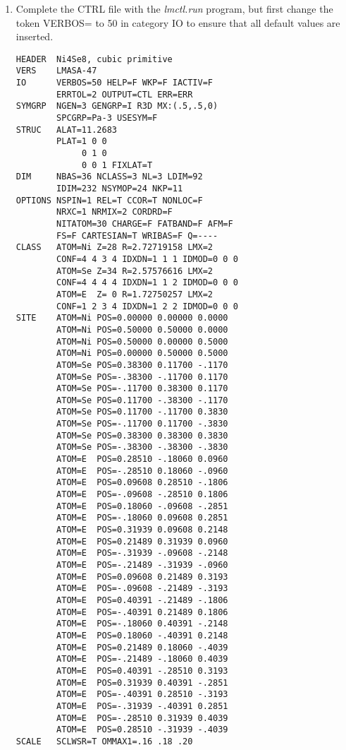 \documentclass[aps,twocolumn,a4]{revtex4}
\begin{document}
\begin{enumerate}
\item Complete the CTRL file with the {\em lmctl.run} program, but first
change the token VERBOS= to 50 in category IO to ensure that all
default values are inserted.
\begin{verbatim}
HEADER  Ni4Se8, cubic primitive
VERS    LMASA-47
IO      VERBOS=50 HELP=F WKP=F IACTIV=F
        ERRTOL=2 OUTPUT=CTL ERR=ERR
SYMGRP  NGEN=3 GENGRP=I R3D MX:(.5,.5,0)
        SPCGRP=Pa-3 USESYM=F
STRUC   ALAT=11.2683
        PLAT=1 0 0
             0 1 0
             0 0 1 FIXLAT=T
DIM     NBAS=36 NCLASS=3 NL=3 LDIM=92
        IDIM=232 NSYMOP=24 NKP=11
OPTIONS NSPIN=1 REL=T CCOR=T NONLOC=F
        NRXC=1 NRMIX=2 CORDRD=F
        NITATOM=30 CHARGE=F FATBAND=F AFM=F
        FS=F CARTESIAN=T WRIBAS=F Q=----
CLASS   ATOM=Ni Z=28 R=2.72719158 LMX=2
        CONF=4 4 3 4 IDXDN=1 1 1 IDMOD=0 0 0
        ATOM=Se Z=34 R=2.57576616 LMX=2
        CONF=4 4 4 4 IDXDN=1 1 2 IDMOD=0 0 0
        ATOM=E  Z= 0 R=1.72750257 LMX=2
        CONF=1 2 3 4 IDXDN=1 2 2 IDMOD=0 0 0
SITE    ATOM=Ni POS=0.00000 0.00000 0.0000
        ATOM=Ni POS=0.50000 0.50000 0.0000
        ATOM=Ni POS=0.50000 0.00000 0.5000
        ATOM=Ni POS=0.00000 0.50000 0.5000
        ATOM=Se POS=0.38300 0.11700 -.1170
        ATOM=Se POS=-.38300 -.11700 0.1170
        ATOM=Se POS=-.11700 0.38300 0.1170
        ATOM=Se POS=0.11700 -.38300 -.1170
        ATOM=Se POS=0.11700 -.11700 0.3830
        ATOM=Se POS=-.11700 0.11700 -.3830
        ATOM=Se POS=0.38300 0.38300 0.3830
        ATOM=Se POS=-.38300 -.38300 -.3830
        ATOM=E  POS=0.28510 -.18060 0.0960
        ATOM=E  POS=-.28510 0.18060 -.0960
        ATOM=E  POS=0.09608 0.28510 -.1806
        ATOM=E  POS=-.09608 -.28510 0.1806
        ATOM=E  POS=0.18060 -.09608 -.2851
        ATOM=E  POS=-.18060 0.09608 0.2851
        ATOM=E  POS=0.31939 0.09608 0.2148
        ATOM=E  POS=0.21489 0.31939 0.0960
        ATOM=E  POS=-.31939 -.09608 -.2148
        ATOM=E  POS=-.21489 -.31939 -.0960
        ATOM=E  POS=0.09608 0.21489 0.3193
        ATOM=E  POS=-.09608 -.21489 -.3193
        ATOM=E  POS=0.40391 -.21489 -.1806
        ATOM=E  POS=-.40391 0.21489 0.1806
        ATOM=E  POS=-.18060 0.40391 -.2148
        ATOM=E  POS=0.18060 -.40391 0.2148
        ATOM=E  POS=0.21489 0.18060 -.4039
        ATOM=E  POS=-.21489 -.18060 0.4039
        ATOM=E  POS=0.40391 -.28510 0.3193
        ATOM=E  POS=0.31939 0.40391 -.2851
        ATOM=E  POS=-.40391 0.28510 -.3193
        ATOM=E  POS=-.31939 -.40391 0.2851
        ATOM=E  POS=-.28510 0.31939 0.4039
        ATOM=E  POS=0.28510 -.31939 -.4039
SCALE   SCLWSR=T OMMAX1=.16 .18 .20

\end{verbatim}
\end{enumerate}
\end{document}
